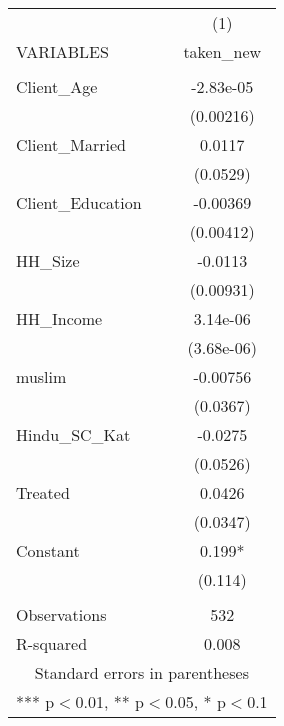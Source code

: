 \begin{tabular}{lc} \hline
 & (1) \\
VARIABLES & taken\_new \\ \hline
 &  \\
Client\_Age & -2.83e-05 \\
 & (0.00216) \\
Client\_Married & 0.0117 \\
 & (0.0529) \\
Client\_Education & -0.00369 \\
 & (0.00412) \\
HH\_Size & -0.0113 \\
 & (0.00931) \\
HH\_Income & 3.14e-06 \\
 & (3.68e-06) \\
muslim & -0.00756 \\
 & (0.0367) \\
Hindu\_SC\_Kat & -0.0275 \\
 & (0.0526) \\
Treated & 0.0426 \\
 & (0.0347) \\
Constant & 0.199* \\
 & (0.114) \\
 &  \\
Observations & 532 \\
 R-squared & 0.008 \\ \hline
\multicolumn{2}{c}{ Standard errors in parentheses} \\
\multicolumn{2}{c}{ *** p$<$0.01, ** p$<$0.05, * p$<$0.1} \\
\end{tabular}
